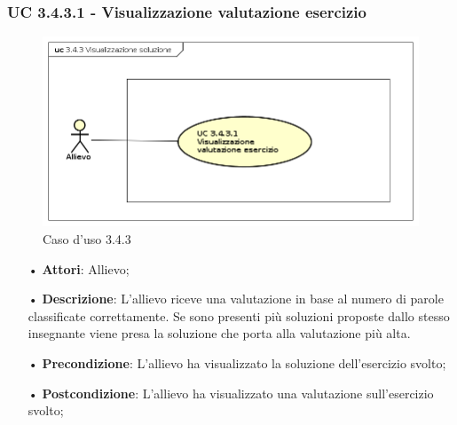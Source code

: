 \subsubsection{UC 3.4.3.1 - Visualizzazione valutazione esercizio}
\begin{figure}[H]
\centering
\includegraphics[width=17cm]{img/UC343.png} 
\caption{Caso d'uso 3.4.3}\label{fig:343}
\end{figure}
\begin{itemize}
\item[•]\textbf{Attori}: Allievo;
\item[•]\textbf{Descrizione}: L'allievo riceve una valutazione in base al numero di parole classificate correttamente. Se sono presenti più soluzioni proposte dallo stesso insegnante viene presa la soluzione che porta alla valutazione più alta.
\item[•]\textbf{Precondizione}: L'allievo ha visualizzato la soluzione dell'esercizio svolto;
\item[•]\textbf{Postcondizione}: L'allievo ha visualizzato una valutazione sull'esercizio svolto;
\end{itemize}


